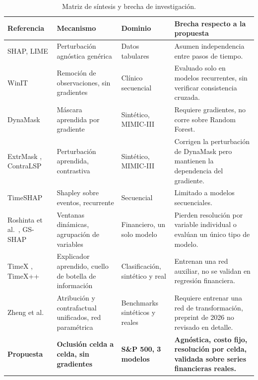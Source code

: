 \begin{table}[h!]
\centering
\footnotesize
\setlength{\tabcolsep}{3pt}
\renewcommand{\arraystretch}{1.3}
\begin{tabular}{|>{\raggedright\arraybackslash}p{5.0cm}|>{\raggedright\arraybackslash}p{2.3cm}|>{\raggedright\arraybackslash}p{2.3cm}|>{\raggedright\arraybackslash}p{3.0cm}|}
\hline
\textbf{Referencia} & \textbf{Mecanismo} & \textbf{Dominio} & \textbf{Brecha respecto a la propuesta} \\ \hline
SHAP, LIME \cite{arsenault2025} & Perturbación agnóstica genérica & Datos tabulares & Asumen independencia entre pasos de tiempo. \\ \hline
WinIT \cite{leung2023winit} & Remoción de observaciones, sin gradientes & Clínico secuencial & Evaluado solo en modelos recurrentes, sin verificar consistencia cruzada. \\ \hline
DynaMask \cite{crabbe2021} & Máscara aprendida por gradiente & Sintético, MIMIC-III & Requiere gradientes, no corre sobre Random Forest. \\ \hline
ExtrMask \cite{enguehard2023}, ContraLSP \cite{liu2024contralsp} & Perturbación aprendida, contrastiva & Sintético, MIMIC-III & Corrigen la perturbación de DynaMask pero mantienen la dependencia del gradiente. \\ \hline
TimeSHAP \cite{bento2021} & Shapley sobre eventos, recurrente & Secuencial & Limitado a modelos secuenciales. \\ \hline
Roshinta et al.\ \cite{roshinta2026}, GS-SHAP \cite{gsshap2026} & Ventanas dinámicas, agrupación de variables & Financiero, un solo modelo & Pierden resolución por variable individual o evalúan un único tipo de modelo. \\ \hline
TimeX \cite{queen2023timex}, TimeX++ \cite{liu2024timexpp} & Explicador aprendido, cuello de botella de información & Clasificación, sintético y real & Entrenan una red auxiliar, no se validan en regresión financiera. \\ \hline
Zheng et al.\ \cite{zheng2026unifiedib} & Atribución y contrafactual unificados, red paramétrica & Benchmarks sintéticos y reales & Requiere entrenar una red de transformación, preprint de 2026 no revisado en detalle. \\ \hline
\textbf{Propuesta} & \textbf{Oclusión celda a celda, sin gradientes} & \textbf{S\&P 500, 3 modelos} & \textbf{Agnóstica, costo fijo, resolución por celda, validada sobre series financieras reales.} \\ \hline
\end{tabular}
\caption{Matriz de síntesis y brecha de investigación.}
\label{tab:gaps}
\end{table}
